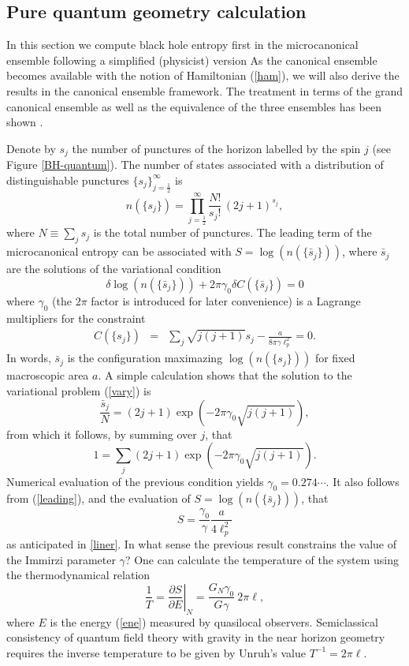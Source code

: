 \documentclass[aps, nofootinbib,superscriptaddress,12pt]{revtex4-2}
\def\be{\begin{equation}}
\def\ee{\end{equation}}
\def\ba{\begin{eqnarray}}
\def\ea{\end{eqnarray}}
\begin{document}
\subsection{Pure quantum geometry calculation}\label{newly}


In this section we compute black hole entropy first in the microcanonical ensemble
following a simplified (physicist) version \cite{Ghosh:2008jc, Ghosh:2006ph}
As  the canonical ensemble
becomes available with the notion of Hamiltonian (\ref{ham}), we will also derive the results in the canonical ensemble framework. 
The treatment in terms of the grand canonical ensemble as well as the equivalence of the three ensembles has been shown \cite{Ghosh:2011fc}.

Denote by $s_j$ the number of punctures of the horizon labelled by the spin $j$ (see Figure \ref{BH-quantum}).
The number of states
associated with a distribution of distinguishable punctures $\{s_j\}_{j=\frac{1}{2}}^\infty$ is
\be
n(\{s_j\})=\prod\limits_{j=\frac{1}{2}}^{\infty}\frac{N!}{s_j!}\,(2j+1)^{s_j},
\ee 
where $N\equiv\sum_j s_j$ is the total number of punctures. The leading term of the microcanonical entropy can be associated with
$S=\log(n(\{\bar s_j\}))$, where $\bar s_j$ are the solutions of the variational condition 
\be\label{vary}
\delta \log(n(\{\bar s_j\}))+2\pi \gamma_0\delta C(\{\bar s_j\})=0
\ee
where $\gamma_0$ (the $2\pi$ factor is introduced for later convenience) is a Lagrange multipliers for the constraint
\ba\label{c1c2}
C(\{ s_j\})&=& \sum_j \sqrt{j(j+1)} s_j-\frac{a}{8\pi\gamma\ell_p^2}=0.
\ea
In words, $\bar s_j$ is the configuration maximazing $\log(n(\{s_j\}))$ for fixed macroscopic area $a$.  
A simple calculation shows that the solution to the variational problem (\ref{vary}) is
\be\label{leading}
\frac{\bar s_j}{N}=(2j+1)\exp(- 2\pi\gamma_0 \sqrt{j(j+1)} ),  
\ee
from which it follows, by summing over $j$, that 
\be\label{condition}
1=\sum_j (2j+1)\exp(- 2\pi \gamma_0 \sqrt{j(j+1)}).
\ee
 Numerical evaluation of the previous 
condition yields $\gamma_0=0.274\cdots$.
It also follows from (\ref{leading}), and the evaluation of $S=\log(n(\{\bar s_j\}))$,  that
\be\label{92}
S=\frac{\gamma_0}{\gamma} \frac{a}{4\ell_p^2}
\ee
as anticipated in \eqref{liner}. 
In what sense the previous  result constrains the value of the Immirzi parameter  $\gamma$?
One can calculate the temperature of the system using  the thermodynamical relation 
\be\label{ttt}
\frac{1}{T}=\left.\frac{\partial S}{\partial E}\right|_N=\frac{G_N \gamma_0}{G_{} \gamma}\ {2\pi \ell},
\ee 
where $E$  is the energy (\ref{ene}) measured by quasilocal observers. Semiclassical consistency of quantum field theory  with gravity in the near horizon geometry requires the inverse temperature to be given by Unruh's value $T^{-1}=2\pi \ell$.  
\end{document}
